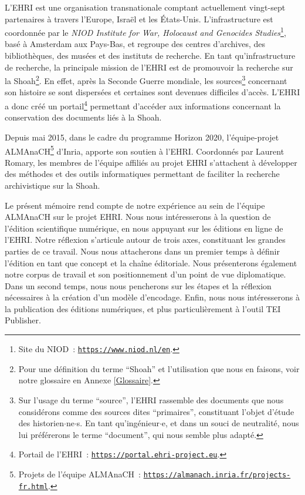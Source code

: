 L'EHRI est une organisation transnationale comptant actuellement vingt-sept partenaires à travers l'Europe, Israël et les États-Unis. L'infrastructure est coordonnée par le \textit{NIOD Institute for War, Holocaust and Genocides Studies}\footnote{Site du NIOD~: \texttt{\href{https://www.niod.nl/en}{https://www.niod.nl/en}}.}, basé à Amsterdam aux Pays-Bas, et regroupe des centres d'archives, des bibliothèques, des musées et des instituts de recherche. En tant qu'infrastructure de recherche, la principale mission de l'EHRI est de promouvoir la recherche sur la Shoah\footnote{Pour une définition du terme \enquote{Shoah} et l'utilisation que nous en faisons, voir notre glossaire en Annexe \ref{Glossaire}.}. En effet, après la Seconde Guerre mondiale, les sources\footnote{Sur l'usage du terme \enquote{source}, l'EHRI rassemble des documents que nous considérons comme des sources dites \enquote{primaires}, constituant l'objet d'étude des historien$\cdot$ne$\cdot$s. En tant qu'ingénieur$\cdot$e, et dans un souci de neutralité, nous lui préférerons le terme \enquote{document}, qui nous semble plus adapté.} concernant son histoire se sont dispersées et certaines sont devenues difficiles d'accès. L'EHRI a donc créé un portail\footnote{Portail de l'EHRI~: \texttt{\href{https://portal.ehri-project.eu}{https://portal.ehri-project.eu}}.} permettant d'accéder aux informations concernant la conservation des documents liés à la Shoah.  

Depuis mai 2015, dans le cadre du programme Horizon 2020, l'équipe-projet ALMAnaCH\footnote{Projets de l'équipe ALMAnaCH~: \texttt{\href{https://almanach.inria.fr/projects-fr.html}{https://almanach.inria.fr/projects-fr.html}}.} d'Inria, apporte son soutien à l'EHRI. Coordonnés par Laurent Romary, les membres de l'équipe affiliés au projet EHRI s'attachent à développer des méthodes et des outils informatiques permettant de faciliter la recherche archivistique sur la Shoah.  

Le présent mémoire rend compte de notre expérience au sein de l'équipe ALMAnaCH sur le projet EHRI. Nous nous intéresserons à la question de l'édition scientifique numérique, en nous appuyant sur les éditions en ligne de l'EHRI. Notre réflexion s'articule autour de trois axes, constituant les grandes parties de ce travail. Nous nous attacherons dans un premier temps à définir l'édition en tant que concept et la chaîne éditoriale. Nous présenterons également notre corpus de travail et son positionnement d'un point de vue diplomatique. Dans un second temps, nous nous pencherons sur les étapes et la réflexion nécessaires à la création d'un modèle d'encodage. Enfin, nous nous intéresserons à la publication des éditions numériques, et plus particulièrement à l'outil TEI Publisher.